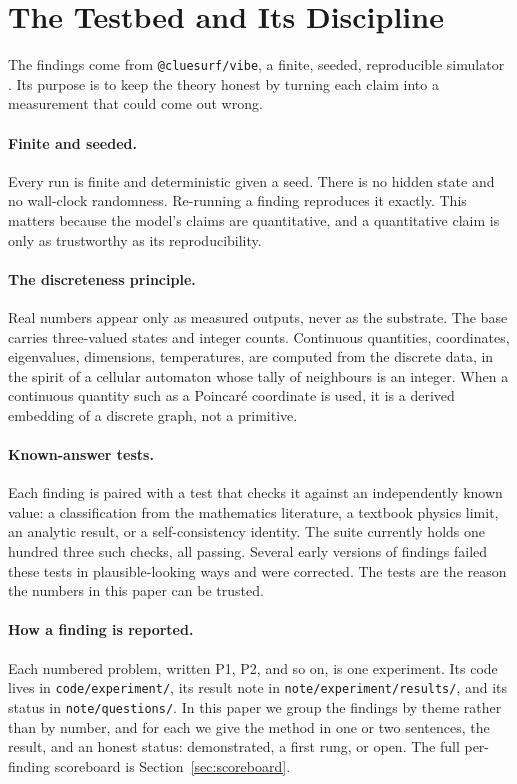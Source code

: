\section{The Testbed and Its Discipline}
\label{sec:testbed}

The findings come from \texttt{@cluesurf/vibe}, a finite, seeded, reproducible simulator
\citep{pollard2026vibetest}. Its purpose is to keep the theory honest by turning each claim into a measurement that
could come out wrong.

\paragraph{Finite and seeded.}
Every run is finite and deterministic given a seed. There is no hidden state and no wall-clock
randomness. Re-running a finding reproduces it exactly. This matters because the model's claims are
quantitative, and a quantitative claim is only as trustworthy as its reproducibility.

\paragraph{The discreteness principle.}
Real numbers appear only as measured outputs, never as the substrate. The base carries
three-valued states and integer counts. Continuous quantities, coordinates, eigenvalues,
dimensions, temperatures, are computed from the discrete data, in the spirit of a cellular
automaton whose tally of neighbours is an integer. When a continuous quantity such as a Poincar\'e
coordinate is used, it is a derived embedding of a discrete graph, not a primitive.

\paragraph{Known-answer tests.}
Each finding is paired with a test that checks it against an independently known value: a
classification from the mathematics literature, a textbook physics limit, an analytic result, or a
self-consistency identity. The suite currently holds one hundred three such checks, all passing.
Several early versions of findings failed these tests in plausible-looking ways and were corrected.
The tests are the reason the numbers in this paper can be trusted.

\paragraph{How a finding is reported.}
Each numbered problem, written P1, P2, and so on, is one experiment. Its code lives in
\texttt{code/experiment/}, its result note in \texttt{note/experiment/results/}, and its status in
\texttt{note/questions/}. In this paper we group the findings by theme rather than by number, and
for each we give the method in one or two sentences, the result, and an honest status: demonstrated,
a first rung, or open. The full per-finding scoreboard is Section~\ref{sec:scoreboard}.

